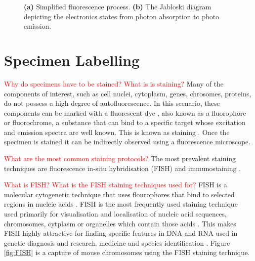 \begin{figure}[!h]
	\centering
	\caption{\textbf{(a)} Simplified fluorescence process. \textbf{(b)} The Jabloski diagram depicting the electronics states from photon absorption to photo emission.}
	\label{fig:thinkoflabel}
\end{figure}


\section{Specimen Labelling}
\label{sec:SpecimenLabelling}

\textcolor{red}{Why do specimens have to be stained? What is is staining?}
Many of the components of interest, such as cell nuclei, cytoplasm, genes, chrosomes, proteins, do not possess a high degree of autofluorescence. 
In this scenario, these components can be marked with a fluorescent dye \citep{Tsien1998}, also known as a fluorophore or fluorochrome, a substance that can bind to a specific target whose excitation and emission spectra are well known. 
This is known as staining \citep{Danek2012,Hubeny2008,Dobrucki2013}. 
Once the specimen is stained it can be indirectly observed using a fluorescence microscope.

\textcolor{red}{What are the most common staining protocols?}
The most prevalent staining techniques are fluorescence in-situ hybridisation (FISH) and immunostaining \citep{Danek2012,Fatima2008,Kozubek2001_2,Theodosiou2007}.

\begin{definition}
	\textcolor{red}{What is FISH?	What is the FISH staining techniques used for?}
	FISH is a molecular cytogenetic technique that uses flourophores that bind to selected regions in nucleic acids \citep{Danek2012,Fatima2008}.
	FISH is the most frequently used staining technique used primarily for visualisation and localisation of nucleic acid sequences, chromosomes, cytplasm or organelles which contain those acids \citep{Hubeny2008}.
	This makes FISH highly attractive for finding specific features in DNA and RNA used in genetic diagnosis and research, medicine and species identification \citep{Amann2008,Fatima2008}.
	Figure \ref{fig:FISH} is a capture of mouse chromosomes using the FISH staining technique.
\end{definition}

